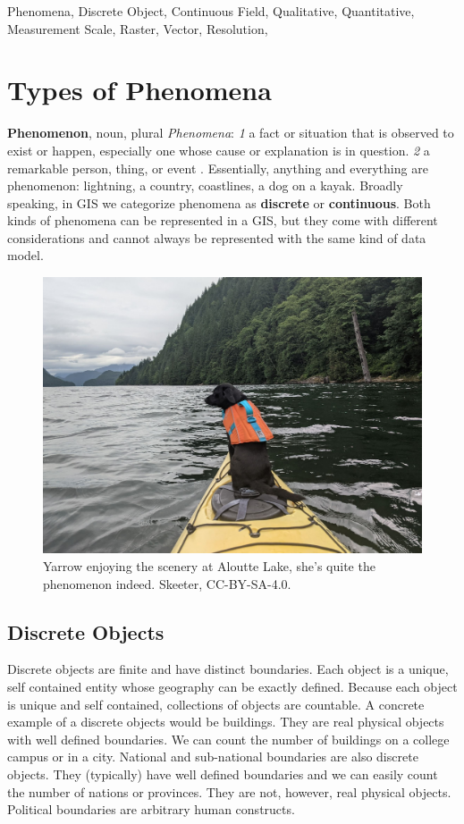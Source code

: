 \documentclass[
]{book}
\begin{document}
Phenomena, Discrete Object, Continuous Field, Qualitative, Quantitative, Measurement Scale, Raster, Vector, Resolution,

\section{Types of Phenomena}\label{types-of-phenomena}

\textbf{Phenomenon}, noun, plural \emph{Phenomena}: \emph{1} a fact or situation that is observed to exist or happen, especially one whose cause or explanation is in question. \emph{2} a remarkable person, thing, or event \citep{oxford_languages_phenomena_nodate}. Essentially, anything and everything are phenomenon: lightning, a country, coastlines, a dog on a kayak. Broadly speaking, in GIS we categorize phenomena as \textbf{discrete} or \textbf{continuous}. Both kinds of phenomena can be represented in a GIS, but they come with different considerations and cannot always be represented with the same kind of data model.

\begin{figure}
\includegraphics[width=0.75\linewidth]{images/03-dog-on-a-boat} \caption{Yarrow enjoying the scenery at Aloutte Lake, she's quite the phenomenon indeed. Skeeter, CC-BY-SA-4.0.}\label{fig:3-dog-on-a-boat}
\end{figure}

\subsection{Discrete Objects}\label{discrete-objects}

Discrete objects are finite and have distinct boundaries. Each object is a unique, self contained entity whose geography can be exactly defined. Because each object is unique and self contained, collections of objects are countable. A concrete example of a discrete objects would be buildings. They are real physical objects with well defined boundaries. We can count the number of buildings on a college campus or in a city. National and sub-national boundaries are also discrete objects. They (typically) have well defined boundaries and we can easily count the number of nations or provinces. They are not, however, real physical objects. Political boundaries are arbitrary human constructs.
\end{document}
